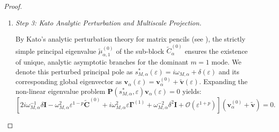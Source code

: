 \documentclass[11pt,a4paper]{article}
\numberwithin{equation}{section}
\begin{document}
\begin{proof}
\begin{enumerate}
\item \textit{Step 3: Kato Analytic Perturbation and Multiscale Projection.}

\medskip
\noindent
By Kato's analytic perturbation theory for matrix pencils (see \cite[Chap. II, Sec. 2.3]{kato1995perturbation}), the strictly simple principal eigenvalue $\widetilde{\mu}_{\alpha, 1}^{(0)}$ of the sub-block $\widetilde{C}_\alpha^{(0)}$ ensures the existence of unique, analytic asymptotic branches for the dominant $m=1$ mode. We denote this perturbed principal pole as $s_{M, \alpha}^\ast(\varepsilon) = i\omega_{M,\alpha} + \delta(\varepsilon)$ and its corresponding global eigenvector as $\mathbf{v}_\alpha(\varepsilon) = \mathbf{v}_\alpha^{(0)} + \tilde{\mathbf{v}}(\varepsilon)$. Expanding the non-linear eigenvalue problem $\mathbf{P}(s_{M, \alpha}^\ast, \varepsilon)\mathbf{v}_\alpha(\varepsilon) = 0$ yields:
$$ \left[ 2i\omega_{M,\alpha}^{-1} \delta \mathbf{I} - \omega_{M,\alpha}^2 \varepsilon^{1-p} \widetilde{\mathbf{C}}^{(0)} + i\omega_{M,\alpha}^2 \varepsilon \mathbf{\Gamma}^{(1)} + \omega_{M,\alpha}^{-2}\delta^2 \mathbf{I} + \mathcal{O}(\varepsilon^{1+p}) \right] (\mathbf{v}_\alpha^{(0)} + \tilde{\mathbf{v}}) = 0. $$


\end{enumerate}
\end{proof}
\end{document}
